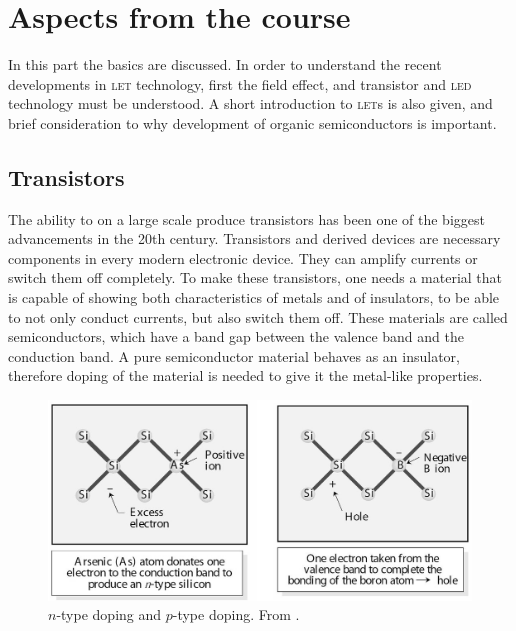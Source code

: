 \section{Aspects from the course}
% 
In this part the basics are discussed. In order to understand the recent developments in \textsc{let} technology, first the field effect, and transistor and \textsc{led} technology must be understood. A short introduction to \textsc{let}s is also given, and brief consideration to why development of organic semiconductors is important.
 
\subsection{Transistors}

The ability to on a large scale produce transistors has been one of the biggest advancements in the 20th century. Transistors and derived devices are necessary components in every modern electronic device. They can amplify currents or switch them off completely. To make these transistors, one needs a material that is capable of showing both characteristics of metals and of insulators, to be able to not only conduct currents, but also switch them off. These materials are called semiconductors, which have a band gap between the valence band and the conduction band. A pure semiconductor material behaves as an insulator, therefore doping of the material is needed to give it the metal-like properties.

\begin{figure}[!ht]
 \begin{center}
  \includegraphics[width=1\textwidth]{doping}
  \caption{$n$-type doping and $p$-type doping. From \citet{vanweesbook}.}
  \label{fig:doping}
 \end{center}
\end{figure}

